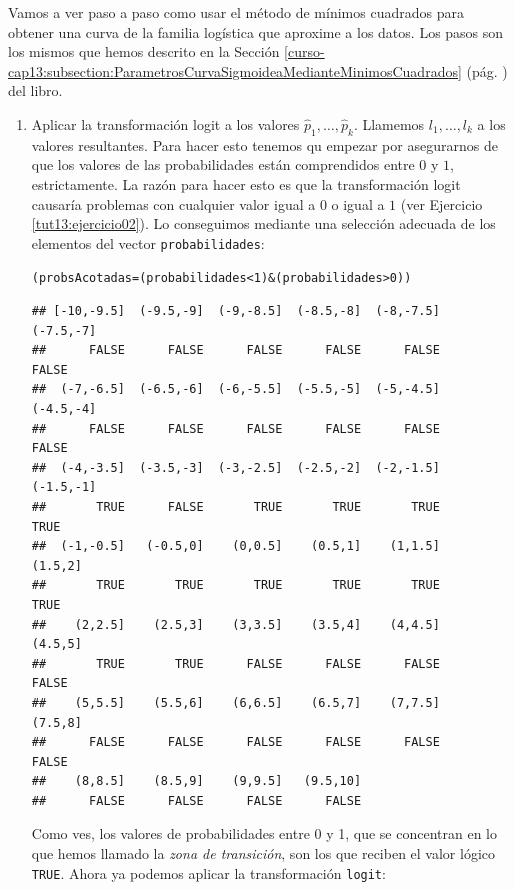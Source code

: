 \documentclass[10pt,a4paper]{article}\usepackage[]{graphicx}\usepackage[]{color}
\makeatletter
\newcommand{\hlnum}[1]{\textcolor[rgb]{0.686,0.059,0.569}{#1}}%
\newcommand{\hlopt}[1]{\textcolor[rgb]{0,0,0}{#1}}%
\newcommand{\hlstd}[1]{\textcolor[rgb]{0.345,0.345,0.345}{#1}}%
\newcommand{\hlkwb}[1]{\textcolor[rgb]{0.69,0.353,0.396}{#1}}%
\newenvironment{kframe}{%
 \def\at@end@of@kframe{}%
 \ifinner\ifhmode%
  \def\at@end@of@kframe{\end{minipage}}%
  \begin{minipage}{\columnwidth}%
 \fi\fi%
 \def\FrameCommand##1{\hskip\@totalleftmargin \hskip-\fboxsep
 \colorbox{shadecolor}{##1}\hskip-\fboxsep
     \hskip-\linewidth \hskip-\@totalleftmargin \hskip\columnwidth}%
 \MakeFramed {\advance\hsize-\width
   \@totalleftmargin\z@ \linewidth\hsize
   \@setminipage}}%
 {\par\unskip\endMakeFramed%
 \at@end@of@kframe}
\newenvironment{knitrout}{}{} %
\makeatother
\begin{document}
Vamos a ver paso a paso como usar el método de mínimos cuadrados para obtener una curva de la familia logística que aproxime a los datos. Los pasos son los mismos que hemos descrito en la Sección \ref{curso-cap13:subsection:ParametrosCurvaSigmoideaMedianteMinimosCuadrados} (pág. \pageref{curso-cap13:subsection:ParametrosCurvaSigmoideaMedianteMinimosCuadrados}) del libro.

\begin{enumerate}
  \item Aplicar la transformación logit a los valores $\hat p_1,\ldots,\hat p_k$. Llamemos $l_1,\ldots,l_k$ a los valores resultantes. Para hacer esto tenemos qu empezar por asegurarnos de que los valores de las probabilidades están comprendidos entre $0$ y $1$, estrictamente. La razón para hacer esto es que la transformación logit causaría problemas con cualquier valor igual a $0$ o igual a $1$ (ver Ejercicio \ref{tut13:ejercicio02}). Lo conseguimos mediante una selección adecuada  de los elementos del vector {\tt probabilidades}:

\begin{knitrout}
\color{fgcolor}\begin{kframe}
\begin{alltt}
\hlstd{(probsAcotadas} \hlkwb{=} \hlstd{(probabilidades} \hlopt{<} \hlnum{1}\hlstd{)} \hlopt{&} \hlstd{(probabilidades} \hlopt{>} \hlnum{0}\hlstd{))}
\end{alltt}
\begin{verbatim}
## [-10,-9.5]  (-9.5,-9]  (-9,-8.5]  (-8.5,-8]  (-8,-7.5]  (-7.5,-7] 
##      FALSE      FALSE      FALSE      FALSE      FALSE      FALSE 
##  (-7,-6.5]  (-6.5,-6]  (-6,-5.5]  (-5.5,-5]  (-5,-4.5]  (-4.5,-4] 
##      FALSE      FALSE      FALSE      FALSE      FALSE      FALSE 
##  (-4,-3.5]  (-3.5,-3]  (-3,-2.5]  (-2.5,-2]  (-2,-1.5]  (-1.5,-1] 
##       TRUE      FALSE       TRUE       TRUE       TRUE       TRUE 
##  (-1,-0.5]   (-0.5,0]    (0,0.5]    (0.5,1]    (1,1.5]    (1.5,2] 
##       TRUE       TRUE       TRUE       TRUE       TRUE       TRUE 
##    (2,2.5]    (2.5,3]    (3,3.5]    (3.5,4]    (4,4.5]    (4.5,5] 
##       TRUE       TRUE      FALSE      FALSE      FALSE      FALSE 
##    (5,5.5]    (5.5,6]    (6,6.5]    (6.5,7]    (7,7.5]    (7.5,8] 
##      FALSE      FALSE      FALSE      FALSE      FALSE      FALSE 
##    (8,8.5]    (8.5,9]    (9,9.5]   (9.5,10] 
##      FALSE      FALSE      FALSE      FALSE
\end{verbatim}
\end{kframe}
\end{knitrout}
Como ves, los valores de probabilidades entre 0 y 1, que se concentran en lo que hemos llamado la {\em zona de transición}, son los que reciben el valor lógico {\tt TRUE}. Ahora ya podemos aplicar la transformación {\tt logit}:


\end{enumerate}
\end{document}
